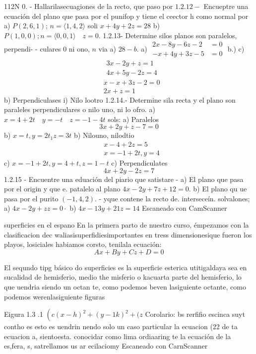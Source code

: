 

112N 0. - Hallarilasecuagiones de la recto, que paso por
$1.2 .12-$ Encueptre una ecuación del plano que pasa por
el punifop y tiene el ceector h como normal por
a) $P(2,6,1)$; $n=\langle 1,4,2\rangle$ soli $x+4 y+2 z=28$
b) $P(1,0,0) ; n=\langle 0,0,1\rangle \quad z=0$.
1.2.13- Determine silos planos son paralelos, perpendi-
- culares 0 ni ono, $n$ via
a) $28-b$.
a) $\begin{aligned} 2 x-8 y-6 z-2 & =0 \\ -x+4 y+3 z-5 & =0\end{aligned}$
b.)
c)
$$
\begin{aligned}
	& 3 x-2 y+z=1 \\
	& 4 x+5 y-2 z=4
\end{aligned}
$$
$$
\begin{aligned}
	& x-x+3 z-2=0 \\
	& 2 x+z=1
\end{aligned}
$$
b) Perpendiculases i) Nilo lootro
1.2.14.- Determine sila recta y el plano son paraleles
perpendiculares o nilo uno, ni lo ofro.
a) $x=4+2 t \quad y=-t \quad z=-1-4 t$ sols: a) Paralelos
$$
3 x+2 y+z-7=0
$$
b) $x=t, y=2 t_1 z=3 t$
b) Nilouno, nilodtio
$$
\begin{aligned}
	& x-4+2 z=5 \\
	& x=-1+2 t, y=4
\end{aligned}
$$
c) $x=-1+2 t, y=4+t, z=1-t$
c) Perpendiculates
$$
4 x+2 y-2 z=7
$$
1.2.15 - Encuentre una eduación del piario que satistare
- a) El plano que pasa por el origin y
que e. patalelo al plano $4 x-2 y+7 z+12=0$.
b) El plano qu ue pasa por el purito $(-1,4,2)$.
- yque contene la recto de. interseceín.
solvalones; a) $4 x-2 y+z z=0 \cdot$ b) $4 x-13 y+21 z=14$
Escaneado con CamScanner




superficies en el espano
En la primera parto de nuestro curso, émpezamos con la clasificacion dec waliasisuperfidiesimportantes en tress dimensionesique fueron los playos, losiciales habiamos corsto, tenilala ecuación:
$$
A x+B y+C z+D=0
$$

El sequndo tipg básico do superficies es la superficie esterica utitigaldaya sea en sucalidad de hemisferio, medio the misferio o kacuarta parte del hemisferio, lo que uendria siendo un
octan te, como podemos beven lasiguiente octante, como podemos werenlasiguiente figuras

Eigura 1.3 .1 $\left(c(x-h)^2+(y-1 k)^2+(z\right.$ Corolario: bs rerfifio escinca suyt contho es esto es uendrin nendo solo un caso particular la ecuacion (22 de ta ecuacion a, sientoesta. conocidar como lima ordiaaring te la ecuación de la es,fera, s, satrellamos us ar ecilaciomy
Escaneado con CarnScanner


